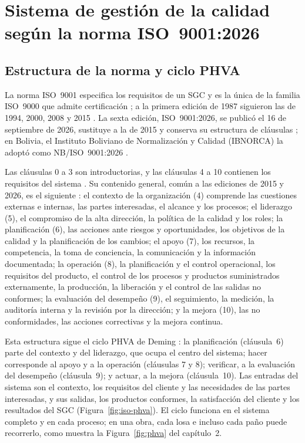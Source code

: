 \section{Sistema de gestión de la calidad según la norma ISO~9001:2026}
\label{sec:sgc-iso}

\subsection{Estructura de la norma y ciclo PHVA}

La norma ISO~9001 especifica los requisitos de un SGC y es la única de la familia ISO~9000 que admite certificación \parencite[p.~17]{zurita2024}; a la primera edición de 1987 siguieron las de 1994, 2000, 2008 y 2015 \parencite[p.~14]{zurita2024}. La sexta edición, ISO~9001:2026, se publicó el 16 de septiembre de 2026, sustituye a la de 2015 y conserva su estructura de cláusulas \parencite{iso9001_2026}; en Bolivia, el Instituto Boliviano de Normalización y Calidad (IBNORCA) la adoptó como NB/ISO~9001:2026 \parencite{ibnorca9001_2026}.

Las cláusulas 0 a 3 son introductorias, y las cláusulas 4 a 10 contienen los requisitos del sistema \parencite[p.~15]{zurita2024}. Su contenido general, común a las ediciones de 2015 y 2026, es el siguiente \parencite{iso9001_2026}: el contexto de la organización (4) comprende las cuestiones externas e internas, las partes interesadas, el alcance y los procesos; el liderazgo (5), el compromiso de la alta dirección, la política de la calidad y los roles; la planificación (6), las acciones ante riesgos y oportunidades, los objetivos de la calidad y la planificación de los cambios; el apoyo (7), los recursos, la competencia, la toma de conciencia, la comunicación y la información documentada; la operación (8), la planificación y el control operacional, los requisitos del producto, el control de los procesos y productos suministrados externamente, la producción, la liberación y el control de las salidas no conformes; la evaluación del desempeño (9), el seguimiento, la medición, la auditoría interna y la revisión por la dirección; y la mejora (10), las no conformidades, las acciones correctivas y la mejora continua.

Esta estructura sigue el ciclo PHVA de Deming \parencite[pp.~15--16]{zurita2024}: la planificación (cláusula~6) parte del contexto y del liderazgo, que ocupa el centro del sistema; hacer corresponde al apoyo y a la operación (cláusulas 7 y 8); verificar, a la evaluación del desempeño (cláusula~9); y actuar, a la mejora (cláusula~10). Las entradas del sistema son el contexto, los requisitos del cliente y las necesidades de las partes interesadas, y sus salidas, los productos conformes, la satisfacción del cliente y los resultados del SGC (Figura~\ref{fig:iso-phva}). El ciclo funciona en el sistema completo y en cada proceso; en una obra, cada losa e incluso cada paño puede recorrerlo, como muestra la Figura~\ref{fig:phva} del capítulo~2.

